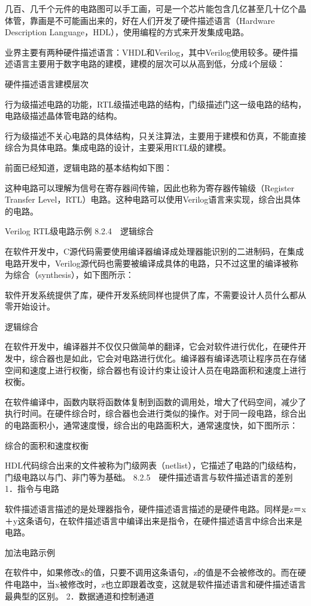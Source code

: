\documentclass[12pt,UTF8]{ctexbook}
\begin{document}
几百、几千个元件的电路图可以手工画，可是一个芯片能包含几亿甚至几十亿个晶体管，靠画是不可能画出来的，好在人们开发了硬件描述语言（Hardware Description Language，HDL），使用编程的方式来开发集成电路。

业界主要有两种硬件描述语言：VHDL和Verilog，其中Verilog使用较多。硬件描述语言主要用于数字电路的建模，建模的层次可以从高到低，分成4个层级：

硬件描述语言建模层次

行为级描述电路的功能，RTL级描述电路的结构，门级描述门这一级电路的结构，电路级描述晶体管电路的结构。

行为级描述不关心电路的具体结构，只关注算法，主要用于建模和仿真，不能直接综合为具体电路。集成电路的设计，主要采用RTL级的建模。

前面已经知道，逻辑电路的基本结构如下图：

这种电路可以理解为信号在寄存器间传输，因此也称为寄存器传输级（Register Transfer Level，RTL）电路。这种电路可以使用Verilog语言来实现，综合出具体的电路。

Verilog RTL级电路示例
8.2.4　逻辑综合

在软件开发中，C源代码需要使用编译器编译成处理器能识别的二进制码，在集成电路开发中，Verilog源代码也需要被编译成具体的电路，只不过这里的编译被称为综合（synthesis），如下图所示：

软件开发系统提供了库，硬件开发系统同样也提供了库，不需要设计人员什么都从零开始设计。

逻辑综合

在软件开发中，编译器并不仅仅只做简单的翻译，它会对软件进行优化，在硬件开发中，综合器也是如此，它会对电路进行优化。编译器有编译选项让程序员在存储空间和速度上进行权衡，综合器也有设计约束让设计人员在电路面积和速度上进行权衡。

在软件编译中，函数内联将函数体复制到函数的调用处，增大了代码空间，减少了执行时间。在硬件综合时，综合器也会进行类似的操作。对于同一段电路，综合出的电路面积小，通常速度慢，综合出的电路面积大，通常速度快，如下图所示：

综合的面积和速度权衡

HDL代码综合出来的文件被称为门级网表（netlist），它描述了电路的门级结构，门级电路以与门、非门等为基础。
8.2.5　硬件描述语言与软件描述语言的差别
1．指令与电路

软件描述语言描述的是处理器指令，硬件描述语言描述的是硬件电路。同样是z＝x＋y这条语句，在软件描述语言中编译出来是指令，在硬件描述语言中综合出来是电路。

加法电路示例

在软件中，如果修改x的值，只要不调用这条语句，z的值是不会被修改的。而在硬件电路中，当x被修改时，z也立即跟着改变，这就是软件描述语言和硬件描述语言最典型的区别。
2．数据通道和控制通道
\end{document}
